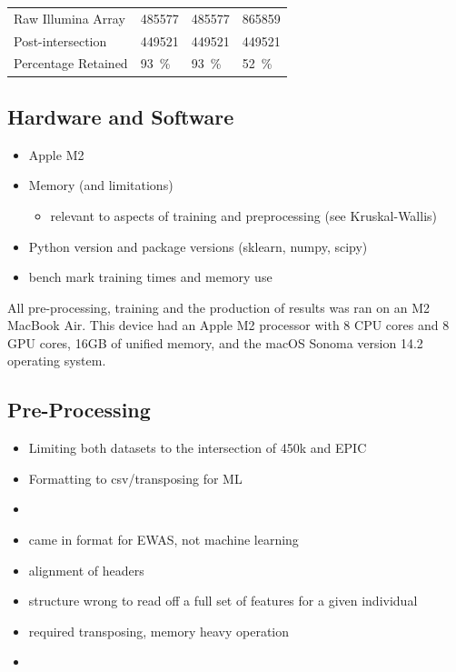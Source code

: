 \documentclass{article}
\begin{document}
\begin{table}
\begin{tabularx}{\textwidth}{X >{\raggedleft\arraybackslash}X >{\raggedleft\arraybackslash}X >{\raggedleft\arraybackslash}X}
        \midrule
        Raw Illumina Array                  & \num{485577}                                  & \num{485577}                                 & \num{865859}                          \\
        Post-intersection                   & \num{449521}                                  & \num{449521}                                 & \num{449521}                          \\
        Percentage Retained                 & \SI{93}{\percent}                             & \SI{93}{\percent}                            & \SI{52}{\percent}                     \\
        \bottomrule
    \end{tabularx}
\end{table}

\subsection{Hardware and Software}
\begin{itemize}
    \item Apple M2
    \item Memory (and limitations)
          \begin{itemize}
              \item relevant to aspects of training and preprocessing (see Kruskal-Wallis)
          \end{itemize}
    \item Python version and package versions (sklearn, numpy, scipy)
    \item bench mark training times and memory use
\end{itemize}

All pre-processing, training and the production of results was ran on an M2 MacBook Air. This device had an Apple M2 processor with 8 CPU cores and 8 GPU cores, 16GB of unified memory, and the macOS Sonoma version 14.2 operating system.

\subsection{Pre-Processing} \label{sec:pre-processing}
\begin{itemize}
    \item Limiting both datasets to the intersection of 450k and EPIC
    \item Formatting to csv/transposing for ML
    \item
    \item came in format for EWAS, not machine learning
    \item alignment of headers
    \item structure wrong to read off a full set of features for a given individual
    \item required transposing, memory heavy operation
    \item
\end{itemize}
\end{document}
